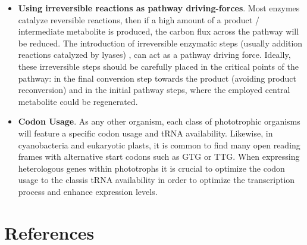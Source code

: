 \begin{itemize}
\item[] \textbf{Using irreversible reactions as pathway driving-forces}. Most enzymes catalyze reversible reactions, then if a high amount  of a product / intermediate metabolite is produced, the carbon flux across the pathway will be reduced. The introduction of irreversible enzymatic steps (usually addition reactions catalyzed by lyases) , can act as a pathway driving force. Ideally, these irreversible steps should be carefully placed in the critical points of the pathway: in the final conversion step towards the product (avoiding product reconversion) and in the initial pathway steps, where the employed central metabolite could be regenerated.
\item[] \textbf{Codon Usage}. As any other organism, each class of phototrophic organisms will feature a specific codon usage and tRNA availability. Likewise, in cyanobacteria and eukaryotic plasts, it is common to find many open reading frames with alternative start codons such as GTG or TTG. When expressing heterologous genes within phototrophs it is crucial to optimize the codon usage to the classis tRNA availability in order to optimize the transcription process and enhance expression levels.
\end{itemize}
\section*{References}
\parencite{Yadav2018} \parencite{Wuest2011} \parencite{Teng2020} \parencite{Wei2020} \parencite{Tang2011} \parencite{Asplund-Samuelsson2021} \parencite{Jablonsky2016}
\parencite{Otero-Muras2021} \parencite{Zhou2019} \parencite{Shih2016} \parencite{Nielsen2003} \parencite{Wang2017} \parencite{Hanson2016} \parencite{Fang2018} \parencite{Long2018} \parencite{Liang2018} \parencite{Lowe2021} \parencite{South2019} \parencite{Roell2021} \parencite{Xin2014} \parencite{Khurshid2020} \parencite{Basler2016} \parencite{Bloom2018} \parencite{Lea-Smith2016}